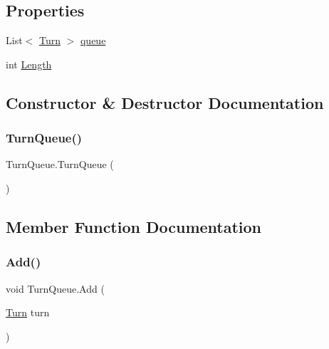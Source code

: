 \subsection*{Properties}
\begin{DoxyCompactItemize}
\item 
List$<$ \mbox{\hyperlink{class_turn}{Turn}} $>$ \mbox{\hyperlink{class_turn_queue_a55c5122a7e3ce31ec8b79e9feb14bd27}{queue}}
\item 
int \mbox{\hyperlink{class_turn_queue_ac5d7ed68bb4f7c1b6e93f55da966a7b3}{Length}}
\end{DoxyCompactItemize}


\subsection{Constructor \& Destructor Documentation}
\mbox{\label{class_turn_queue_a15bbf8315c0dc5ad3d211872f3de296b}} 
\subsubsection{\texorpdfstring{TurnQueue()}{TurnQueue()}}
{\footnotesize\ttfamily Turn\+Queue.\+Turn\+Queue (\begin{DoxyParamCaption}{ }\end{DoxyParamCaption})}



\subsection{Member Function Documentation}
\mbox{\label{class_turn_queue_aa677cc3ae9812e45a5b7e8932c199e27}} 
\subsubsection{\texorpdfstring{Add()}{Add()}}
{\footnotesize\ttfamily void Turn\+Queue.\+Add (\begin{DoxyParamCaption}\item[{\mbox{\hyperlink{class_turn}{Turn}}}]{turn }\end{DoxyParamCaption})}

